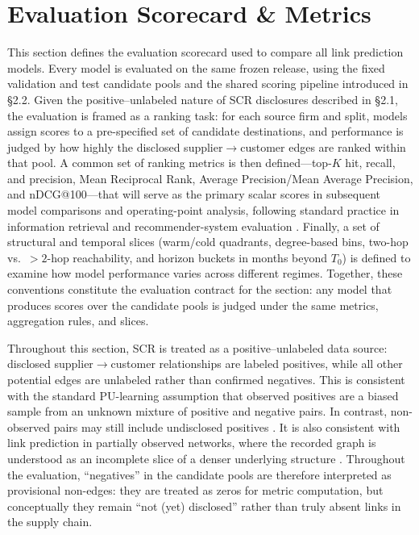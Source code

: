 \section{Evaluation Scorecard \& Metrics}
\label{sec:eval-scorecard}

This section defines the evaluation scorecard used to compare all link prediction models. Every model is evaluated on the same frozen release, using the fixed validation and test candidate pools and the shared scoring pipeline introduced in \S2.2. Given the positive--unlabeled nature of SCR disclosures described in \S2.1, the evaluation is framed as a ranking task: for each source firm and split, models assign scores to a pre-specified set of candidate destinations, and performance is judged by how highly the disclosed supplier$\to$customer edges are ranked within that pool. A common set of ranking metrics is then defined---top-$K$ hit, recall, and precision, Mean Reciprocal Rank, Average Precision/Mean Average Precision, and nDCG@100---that will serve as the primary scalar scores in subsequent model comparisons and operating-point analysis, following standard practice in information retrieval and recommender-system evaluation \parencite{manning_introduction_2008,herlocker_evaluating_2004, shani_evaluating_2011}. Finally, a set of structural and temporal slices (warm/cold quadrants, degree-based bins, two-hop vs.\ $>2$-hop reachability, and horizon buckets in months beyond $T_0$) is defined to examine how model performance varies across different regimes. Together, these conventions constitute the evaluation contract for the section: any model that produces scores over the candidate pools is judged under the same metrics, aggregation rules, and slices.

Throughout this section, SCR is treated as a positive--unlabeled data source: disclosed supplier$\to$customer relationships are labeled positives, while all other potential edges are unlabeled rather than confirmed negatives. This is consistent with the standard PU-learning assumption that observed positives are a biased sample from an unknown mixture of positive and negative pairs. In contrast, non-observed pairs may still include undisclosed positives \parencite{elkan_learning_2008,du_plessis_convex_2015}. It is also consistent with link prediction in partially observed networks, where the recorded graph is understood as an incomplete slice of a denser underlying structure \parencite{liben-nowell_link_2003,lu_link_2011}. Throughout the evaluation, ``negatives'' in the candidate pools are therefore interpreted as provisional non-edges: they are treated as zeros for metric computation, but conceptually they remain ``not (yet) disclosed'' rather than truly absent links in the supply chain.

